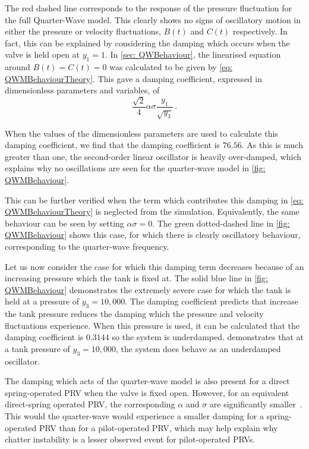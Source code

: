 The red dashed line corresponds to the response of the pressure fluctuation for the full Quarter-Wave model. This clearly shows no signs of oscillatory motion in either the pressure or velocity fluctuations, $B(t)$ and $C(t)$ respectively. In fact, this can be explained by considering the damping which occurs when the valve is held open at $y_1 = 1$. In \cref{sec: QWBehaviour}, the linearised equation around $B(t) = C(t) = 0$ was calculated to be given by \cref{eq: QWMBehaviourTheory}. This gave a damping coefficient, expressed in dimensionless parameters and variables, of
~
\begin{equation*}
    \frac{\sqrt{2}}{4} \alpha \sigma \frac{y_1}{\sqrt{y_3}} \, .
\end{equation*}

When the values of the dimensionless parameters are used to calculate this damping coefficient, we find that the damping coefficient is $76.56$. As this is much greater than one, the second-order linear oscillator is heavily over-damped, which explains why no oscillations are seen for the quarter-wave model in \cref{fig: QWMBehaviour}.

This can be further verified when the term which contributes this damping in \cref{eq: QWMBehaviourTheory} is neglected from the simulation. Equivalently, the same behaviour can be seen by setting $\alpha \sigma = 0$. The green dotted-dashed line in \cref{fig: QWMBehaviour} shows this case, for which there is clearly oscillatory behaviour, corresponding to the quarter-wave frequency.

Let us now consider the case for which this damping term decreases because of an increasing pressure which the tank is fixed at. The solid blue line in \cref{fig: QWMBehaviour} demonstrates the extremely severe case for which the tank is held at a pressure of $y_3 = 10,000$. The damping coefficient predicts that increase the tank pressure reduces the damping which the pressure and velocity fluctuations experience. When this pressure is used, it can be calculated that the damping coefficient is $0.3144$ so the system is underdamped.  demonstrates that at a tank pressure of $y_3 = 10,000$, the system does behave as an underdamped oscillator.

The damping which acts of the quarter-wave model is also present for a direct spring-operated PRV when the valve is fixed open. However, for an equivalent direct-spring operated PRV, the corresponding $\alpha$ and $\sigma$ are significantly smaller~\cite{Hos2015DynamicModelling}. This would the quarter-wave would experience a smaller damping for a spring-operated PRV than for a pilot-operated PRV, which may help explain why chatter instability is a lesser observed event for pilot-operated PRVs.

